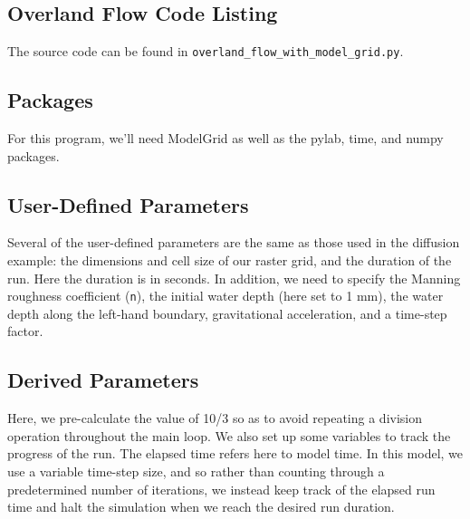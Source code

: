 \documentclass[12pt]{article}
\newcommand{\code}[1]{{\tt #1}}
\begin{document}
\subsection{Overland Flow Code Listing}

The source code can be found in \code{overland\_flow\_with\_model\_grid.py}.



\subsection{Packages}



For this program, we'll need ModelGrid as well as the pylab, time, and numpy packages.

\subsection{User-Defined Parameters}



Several of the user-defined parameters are the same as those used in the diffusion example: the dimensions and cell size of our raster grid, and the duration of the run. Here the duration is in seconds. In addition, we need to specify the Manning roughness coefficient (\code{n}), the initial water depth (here set to 1 mm), the water depth along the left-hand boundary, gravitational acceleration, and a time-step factor.

\subsection{Derived Parameters}



Here, we pre-calculate the value of 10/3 so as to avoid repeating a division operation throughout the main loop. We also set up some variables to track the progress of the run. The elapsed time refers here to model time. In this model, we use a variable time-step size, and so rather than counting through a predetermined number of iterations, we instead keep track of the elapsed run time and halt the simulation when we reach the desired run duration.
\end{document}
